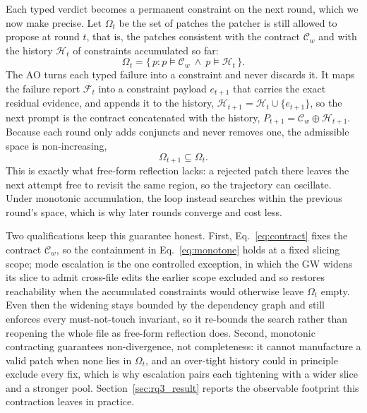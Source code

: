 \documentclass[10pt,conference]{IEEEtran}
\begin{document}
Each typed verdict becomes a permanent constraint on the next round, which we now make precise. Let $\Omega_t$ be the set of patches the patcher is still allowed to propose at round $t$, that is, the patches consistent with the contract $\mathcal{C}_w$ and with the history $\mathcal{H}_t$ of constraints accumulated so far:
\begin{equation}
\label{eq:contract}
    \Omega_t = \{\, p : p \models \mathcal{C}_w \ \wedge\ p \models \mathcal{H}_t \,\}.
\end{equation}
The AO turns each typed failure into a constraint and never discards it. It maps the failure report $\mathcal{F}_t$ into a constraint payload $e_{t+1}$ that carries the exact residual evidence, and appends it to the history, $\mathcal{H}_{t+1} = \mathcal{H}_t \cup \{e_{t+1}\}$, so the next prompt is the contract concatenated with the history, $P_{t+1} = \mathcal{C}_w \oplus \mathcal{H}_{t+1}$. Because each round only adds conjuncts and never removes one, the admissible space is non-increasing,
\begin{equation}
\label{eq:monotone}
    \Omega_{t+1} \subseteq \Omega_t .
\end{equation}
This is exactly what free-form reflection lacks: a rejected patch there leaves the next attempt free to revisit the same region, so the trajectory can oscillate. Under monotonic accumulation, the loop instead searches within the previous round's space, which is why later rounds converge and cost less.

Two qualifications keep this guarantee honest. First, Eq.~\eqref{eq:contract} fixes the contract $\mathcal{C}_w$, so the containment in Eq.~\eqref{eq:monotone} holds at a fixed slicing scope; mode escalation is the one controlled exception, in which the GW widens its slice to admit cross-file edits the earlier scope excluded and so restores reachability when the accumulated constraints would otherwise leave $\Omega_t$ empty. Even then the widening stays bounded by the dependency graph and still enforces every must-not-touch invariant, so it re-bounds the search rather than reopening the whole file as free-form reflection does. Second, monotonic contracting guarantees non-divergence, not completeness: it cannot manufacture a valid patch when none lies in $\Omega_t$, and an over-tight history could in principle exclude every fix, which is why escalation pairs each tightening with a wider slice and a stronger pool. Section~\ref{sec:rq3_result} reports the observable footprint this contraction leaves in practice.
\end{document}
